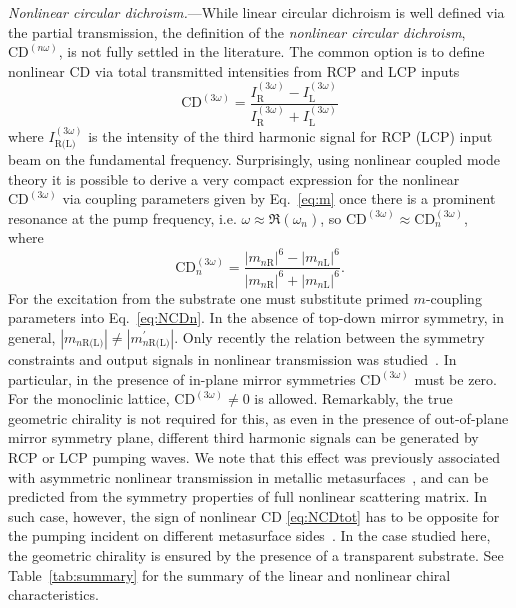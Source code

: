 \documentclass[
    reprint,
    superscriptaddress,
    a4paper,
    amsmath,amssymb,
    prl,
]{revtex4-2}
\begin{document}
\textit{Nonlinear circular dichroism.}---While linear circular dichroism is well defined via the partial transmission, the definition of the \textit{nonlinear circular dichroism}, $\mathrm{CD}^{(n \omega)}$, is not fully settled in the literature.
The common option is to define nonlinear CD via total transmitted intensities from RCP and LCP inputs~\cite{SM,Petralli-Mallow1993JPhysChem,Kim2020NanoLett,Frizyuk2021NanoLett,Tang2020LaserPhotonicsRev}
\begin{equation}
    \mathrm{CD}^{(3\omega)} = \frac{I_{\text{R}}^{(3\omega)} - I_{\text{L}}^{(3\omega)}}{I_{\text{R}}^{(3\omega)} + I_{\text{L}}^{(3\omega)}} 
    \label{eq:NCDtot}
\end{equation}
where $I^{(3\omega)}_{\text{R(L)}}$ is the intensity of the third harmonic signal for RCP (LCP) input beam on the fundamental frequency.
Surprisingly, using nonlinear coupled mode theory it is possible to derive a very compact expression for the nonlinear $\mathrm{CD}^{(3\omega)}$ via coupling parameters given by Eq.~\eqref{eq:m} once there is a prominent resonance at the pump frequency, i.e. $\omega \approx \Re ( \omega_n)$, so \(\mathrm{CD}^{(3\omega)} \approx \mathrm{CD}^{(3\omega)}_n\), where~\cite{SM,Koshelev2023ACSPhot}
\begin{equation}
    \mathrm{CD}^{(3\omega)}_n = \frac{|m_{n\text{R}}|^6-|m_{n\text{L}}|^6}{|m_{n\text{R}}|^6+|m_{n\text{L}}|^6}.
    \label{eq:NCDn}
\end{equation}
For the excitation from the substrate one must substitute primed $m$-coupling parameters into Eq.~\eqref{eq:NCDn}. In the absence of top-down mirror symmetry, in general, $|m_{n\text{R(L)}}| \neq |m^{\prime}_{n\text{R(L)}}|$. 
Only recently the relation between the symmetry constraints and output signals in nonlinear transmission was studied~\cite{Koshelev2024JOPT}. In particular, in the presence of in-plane mirror symmetries $\mathrm{CD}^{(3\omega)}$ must be zero. For the monoclinic lattice, $\mathrm{CD}^{(3\omega)} \neq 0$ is allowed.
Remarkably, the true geometric chirality is not required for this, as even in the presence of out-of-plane mirror symmetry plane, different third harmonic signals can be generated by RCP or LCP pumping waves. {We note that this effect was previously associated with asymmetric nonlinear transmission in metallic metasurfaces~\cite{Achouri2018IEEE}, and can be predicted from the symmetry properties of full nonlinear scattering matrix}.  
In such case, however, the sign of nonlinear CD \eqref{eq:NCDtot} has to be opposite for the pumping incident on different metasurface sides~\cite{SM,Koshelev2024JOPT}.
In the case studied here, the geometric chirality is ensured by the presence of a transparent substrate. See Table~\ref{tab:summary} for the summary of the linear and nonlinear chiral characteristics.
\end{document}
